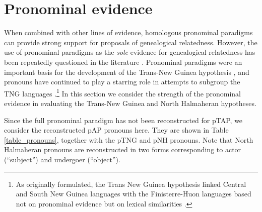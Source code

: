 \section{Pronominal evidence} \label{sec:4:3}
When combined with other lines of evidence, homologous pronominal paradigms can provide strong support for proposals of genealogical relatedness. However, the use of pronominal paradigms as the \textit{sole }evidence for genealogical relatedness has been repeatedly questioned in the literature \citep[cf.][]{CampbellEtAl2008}. Pronominal paradigms were an important basis for the development of the Trans-New Guinea hypothesis \citep{WurmEtAl1975}, and pronouns have continued to play a starring role in attempts to subgroup the TNG languages \citep{Ross2005,Ross2006}.\footnote{As originally formulated, the Trans New Guinea hypothesis linked Central and South New Guinea languages with the Finisterre-Huon languages based not on pronominal evidence but on lexical similarities \citep{McElhanonEtAl1970}.} In this section we consider the strength of the pronominal evidence in evaluating the Trans-New Guinea and North Halmaheran hypotheses.
 

Since the full pronominal paradigm has not been reconstructed for pTAP, we consider the reconstructed pAP pronouns here. They are shown in Table \ref{table_pronouns}, together with the pTNG \citep{Ross2005} and pNH \citep{Wada1980} pronouns. Note that North Halmaheran pronouns are reconstructed in two forms corresponding to actor (``subject'') and undergoer (``object'').




